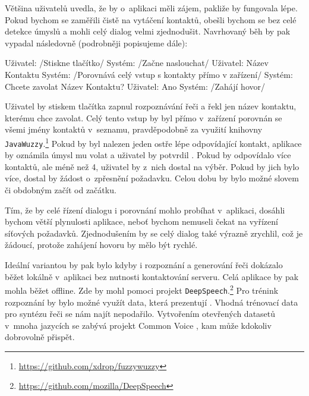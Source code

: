 Většina uživatelů uvedla, že by o~aplikaci měli zájem, pakliže by fungovala
lépe. Pokud bychom se zaměřili čistě na vytáčení kontaktů, obešli bychom se
bez celé detekce úmyslů a mohli celý dialog velmi zjednodušit.
Navrhovaný běh by pak vypadal následovně (podrobněji popisujeme dále):
\begin{code}
    Uživatel: /Stiskne tlačítko/
    Systém:   /Začne naslouchat/
    Uživatel: Název Kontaktu
    Systém:   /Porovnává celý vstup s kontakty přímo v zařízení/
    Systém:   Chcete zavolat Název Kontaktu?
    Uživatel: Ano
    Systém:   /Zahájí hovor/
\end{code}
Uživatel by stiskem
tlačítka zapnul rozpoznávání řeči a řekl jen název kontaktu,
kterému chce zavolat. Celý tento vstup by byl přímo v~zařízení
porovnán se všemi jmény kontaktů v~seznamu, pravděpodobně za
využití knihovny \texttt{JavaWuzzy}.\footnote{\url{https://github.com/xdrop/fuzzywuzzy}} Pokud by byl
nalezen jeden ostře lépe odpovídající kontakt, aplikace
by oznámila úmysl mu volat a uživatel by potvrdil .
Pokud by odpovídalo více kontaktů, ale méně než 4, uživatel
by z~nich dostal na výběr. Pokud by jich bylo více, dostal by
žádost o~zpřesnění požadavku. Celou dobu by bylo možné slovem
 či obdobným začít od začátku.

Tím, že by celé řízení dialogu i porovnání mohlo probíhat v~aplikaci,
dosáhli bychom větší plynulosti aplikace, neboť bychom nemuseli čekat
na vyřízení síťových požadavků. Zjednodušením by se celý dialog také
výrazně zrychlil, což je žádoucí, protože zahájení hovoru by mělo
být rychlé.

Ideální variantou by pak bylo kdyby i rozpoznání a generování řeči
dokázalo běžet lokálně v~aplikaci bez nutnosti kontaktování serveru.
Celá aplikace by pak mohla běžet offline. Zde by mohl pomoci projekt
\texttt{DeepSpeech}.\footnote{\url{https://github.com/mozilla/DeepSpeech}}
Pro trénink rozpoznání by bylo možné využít data, která prezentují \citet{kratochvil-etal-2020-large}.
Vhodná trénovací data pro syntézu řeči se nám najít nepodařilo. Vytvořením
otevřených datasetů v~mnoha jazycích se zabývá projekt Common Voice \citep{commonvoice_2020},
kam může kdokoliv dobrovolně přispět.